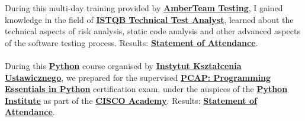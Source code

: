     \begin{rightcolumn}\noindent \small
        \hspace{-2.4pt}
            {During this multi-day training provided by \href{https://www.amberteam.pl/}{\textbf{AmberTeam Testing}}, I gained knowledge in the field of \href{https://www.istqb.org/certifications/technical-test-analyst}{\textbf{ISTQB Technical Test Analyst}}, learned about the technical aspects of risk analysis, static code analysis and other advanced aspects of the software testing process.}
        {Results: \href{https://drive.google.com/file/d/1WwfEmnIlJKEFpINr4jTWSFmnCXFLiDe3/view}{\textbf{Statement of Attendance}}.}\\
        \vspace{\itemspace}\\
            {During this \href{https://www.python.org/}{\textbf{Python}} course organised by \href{http://iku-szkolenia.pl/}{\textbf{Instytut Kształcenia Ustawicznego}}, we prepared for the supervised \href{https://www.netacad.com/courses/programming/pcap-programming-essentials-python}{\textbf{PCAP: Programming Essentials in Python}} certification exam, under the auspices of the \href{https://pythoninstitute.org/}{\textbf{Python Institute}} as part of the \href{https://www.netacad.com/}{\textbf{CISCO Academy}}.}
        {Results: \href{https://drive.google.com/file/d/19MBRMRG7BXdnB-8vFiySWSYVE58n8XDh/view}{\textbf{Statement of Attendance}}.}\\
        \vspace{\itemspace}\\   

\end{rightcolumn}
